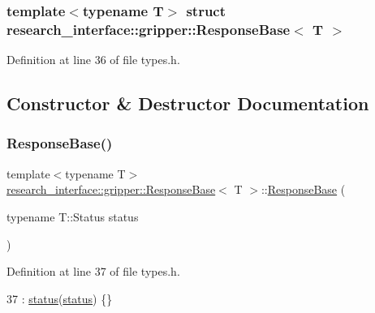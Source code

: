 \subsubsection*{template$<$typename T$>$\newline
struct research\+\_\+interface\+::gripper\+::\+Response\+Base$<$ T $>$}



Definition at line 36 of file types.\+h.



\subsection{Constructor \& Destructor Documentation}
\mbox{\label{structresearch__interface_1_1gripper_1_1ResponseBase_a22a7f3cb6744d19e3ce8fe36536cdfc4}} 
\subsubsection{\texorpdfstring{Response\+Base()}{ResponseBase()}}
{\footnotesize\ttfamily template$<$typename T$>$ \\
\hyperlink{structresearch__interface_1_1gripper_1_1ResponseBase}{research\+\_\+interface\+::gripper\+::\+Response\+Base}$<$ T $>$\+::\hyperlink{structresearch__interface_1_1gripper_1_1ResponseBase}{Response\+Base} (\begin{DoxyParamCaption}\item[{typename T\+::\+Status}]{status }\end{DoxyParamCaption})\hspace{0.3cm}{\ttfamily [inline]}}



Definition at line 37 of file types.\+h.


\begin{DoxyCode}
37 : \hyperlink{structresearch__interface_1_1gripper_1_1ResponseBase_a4d4d13a790eac0381966f39dbcdff84a}{status}(\hyperlink{structresearch__interface_1_1gripper_1_1ResponseBase_a4d4d13a790eac0381966f39dbcdff84a}{status}) \{\}
\end{DoxyCode}



